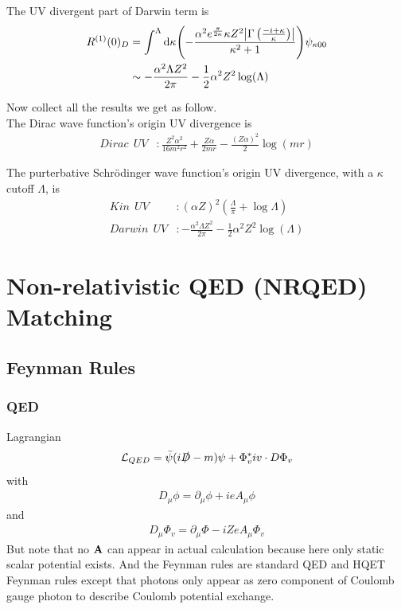 \documentclass[aps,prd,preprint,showkeys,notitlepage,10pt]{revtex4-1}
\renewcommand{\a}{\alpha}
\newcommand{\ka}{\kappa}
\newcommand{\lag}{\mathcal{L}}
\begin{document}
The UV divergent part of Darwin term is
\begin{align}
	R^{(1)}(0)_D & =\int^{\Lambda}\dd \ka\pqty{-\frac{\alpha ^2 e^{\frac{\pi }{2 \kappa }} \kappa  Z^2 \abs{ \Gamma \left(\frac{-i+\kappa }{\kappa }\right)} }{\kappa ^2+1}}\psi_{\ka00}
	\\&\sim-\frac{\alpha ^2 \Lambda  Z^2}{2 \pi }-\frac{1}{2} \alpha ^2 Z^2 \log (\Lambda )
\end{align}

Now collect all the results we get as follow.\\
The Dirac wave function's origin UV divergence is
\begin{align}
	Dirac\ \ UV & :\frac{Z^2\a^2}{16m^2r^2}+\frac{Z\a}{2mr}-\frac{(Z\alpha)^2}{2}\log(m r)
\end{align}

The purterbative Schr\"odinger wave function's origin UV divergence, with a $\ka$ cutoff $\Lambda$, is
\begin{align}
	Kin\ \  UV    & :(\alpha Z)^2(\frac{\Lambda}{\pi }+\log{\Lambda})                                 \\
	Darwin\ \  UV & :-\frac{\alpha ^2 \Lambda  Z^2}{2 \pi }-\frac{1}{2} \alpha ^2 Z^2 \log (\Lambda )
\end{align}

\section{Non-relativistic QED (NRQED) Matching}
\subsection{Feynman Rules}
\subsubsection{QED}
Lagrangian
\begin{align}
	\lag_{QED}=\bar\psi(i\slashed D-m)\psi+\Phi_v^*iv\cdot D\Phi_v
	\label{SQEDLAG}
\end{align}
with
\begin{align*}
	D_{\mu}\phi=\partial_{\mu}\phi+ieA_{\mu}\phi
\end{align*}
and
\begin{align*}
	D_{\mu}\Phi_v=\partial_{\mu}\Phi-iZeA_{\mu}\Phi_v
\end{align*}
But note that no $\vb{A}$ can appear in actual calculation because here only static scalar potential exists.
And the Feynman rules are standard QED and HQET Feynman rules except that photons only appear as zero component of Coulomb gauge photon to describe Coulomb potential exchange.
\end{document}
